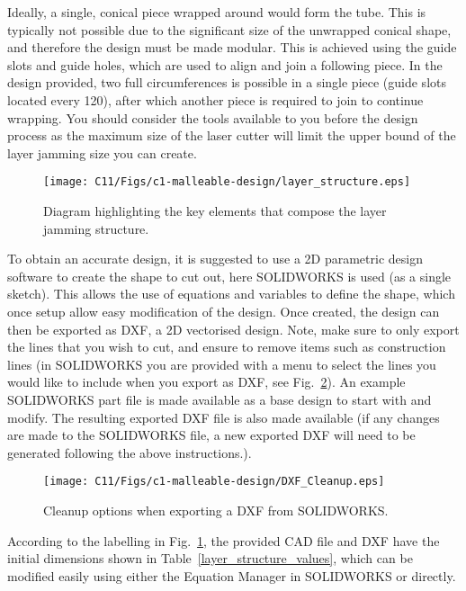 Ideally, a single, conical piece wrapped around would form the tube. This is typically not possible due to the significant size of the unwrapped conical shape, and therefore the design must be made modular. This is achieved using the guide slots and guide holes, which are used to align and join a following piece. In the design provided, two full circumferences is possible in a single piece (guide slots located every 120\textdegree ), after which another piece is required to join to continue wrapping. You should consider the tools available to you before the design process as the maximum size of the laser cutter will limit the upper bound of the layer jamming size you can create. 

\begin{figure}[t!]
    \centering
    \texttt{[image: C11/Figs/c1-malleable-design/layer\_structure.eps]}
    \caption{Diagram highlighting the key elements that compose the layer jamming structure.}
    \label{layer_structure}
\end{figure}

To obtain an accurate design, it is suggested to use a 2D parametric design software to create the shape to cut out, here SOLIDWORKS is used (as a single sketch). This allows the use of equations and variables to define the shape, which once setup allow easy modification of the design. Once created, the design can then be exported as DXF, a 2D vectorised design. Note, make sure to only export the lines that you wish to cut, and ensure to remove items such as construction lines (in SOLIDWORKS you are provided with a menu to select the lines you would like to include when you export as DXF, see Fig.~\ref{DXF_Cleanup}). An example SOLIDWORKS part file is made available as a base design to start with and modify. The resulting exported DXF file is also made available (if any changes are made to the SOLIDWORKS file, a new exported DXF will need to be generated following the above instructions.).

\begin{figure}[t!]
    \centering
    \texttt{[image: C11/Figs/c1-malleable-design/DXF\_Cleanup.eps]}
    \caption{Cleanup options when exporting a DXF from SOLIDWORKS.}
    \label{DXF_Cleanup}
\end{figure}

According to the labelling in Fig.~\ref{layer_structure}, the provided CAD file and DXF have the initial dimensions shown in Table~\ref{layer_structure_values}, which can be modified easily using either the Equation Manager in SOLIDWORKS or directly.

